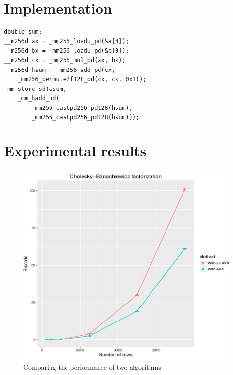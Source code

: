 \documentclass[sigplan]{acmart}
\begin{document}
\section{Implementation}

\lstset {language=C++}
\begin{lstlisting}
double sum;
__m256d ax = _mm256_loadu_pd(&a[0]);
__m256d bx = _mm256_loadu_pd(&b[0]);
__m256d cx = _mm256_mul_pd(ax, bx);
__m256d hsum = _mm256_add_pd(cx,
    _mm256_permute2f128_pd(cx, cx, 0x1));
_mm_store_sd(&sum,
    _mm_hadd_pd(
        _mm256_castpd256_pd128(hsum),
        _mm256_castpd256_pd128(hsum)));
\end{lstlisting}

\section{Experimental results}

\begin{figure}[H]
  \begin{center}
  \includegraphics[width=\linewidth]{img/experiment}
  \caption{Comparing the performance of two algorithms}
  \end{center}
\end{figure}




\end{document}
